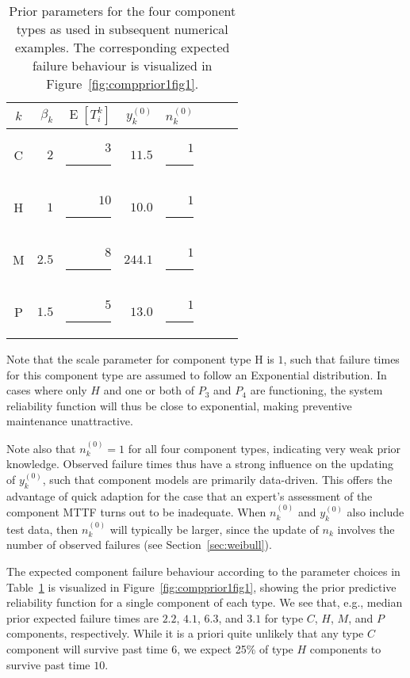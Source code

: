 \documentclass[authoryear]{elsarticle}
\newcommand{\uz}{^{(0)}} %
\newcommand{\E}{\operatorname{E}}
\def\ykz{y\uz_k}
\def\nkz{n\uz_k}
\begin{document}
\begin{table}
\centering
\begin{tabular}{crrrrrrr}
  \toprule
$k$ & $\beta_k$ & $\E[T_i^k]$ & $\ykz$ & $\nkz$ \\
  \midrule
C & $2  $ & $ 3$\rule{1.5ex}{0ex} & $ 11.5$ & $1$\rule{1ex}{0ex} \\
H & $1  $ & $10$\rule{1.5ex}{0ex} & $ 10.0$ & $1$\rule{1ex}{0ex} \\
M & $2.5$ & $ 8$\rule{1.5ex}{0ex} & $244.1$ & $1$\rule{1ex}{0ex} \\
P & $1.5$ & $ 5$\rule{1.5ex}{0ex} & $ 13.0$ & $1$\rule{1ex}{0ex} \\
  \bottomrule
\end{tabular}
\caption{Prior parameters for the four component types as used in subsequent numerical examples.
The corresponding expected failure behaviour is visualized in Figure~\ref{fig:compprior1fig1}.}
\label{tab:priorparams}
\end{table}

Note that the scale parameter for component type H is $1$,
such that failure times for this component type are assumed to follow an Exponential distribution.
In cases where only $H$ and one or both of $P_3$ and $P_4$ are functioning,
the system reliability function will thus be close to exponential,
making preventive maintenance unattractive.

Note also that $\nkz = 1$ for all four component types,
indicating very weak prior knowledge.
Observed failure times thus have a strong influence on the updating of $\ykz$,
such that component models are primarily data-driven.
This offers the advantage of quick adaption
for the case that an expert's assessment of the component MTTF turns out to be inadequate.
When $\nkz$ and $\ykz$ also include test data,
then $\nkz$ will typically be larger,
since the update of $n_k$ involves the number of observed failures
(see Section~\ref{sec:weibull}).

The expected component failure behaviour according to the parameter choices in Table~\ref{tab:priorparams}
is visualized in Figure~\ref{fig:compprior1fig1},
showing the prior predictive reliability function for a single component of each type.
We see that, e.g., median prior expected failure times are
$2.2$, $4.1$, $6.3$, and $3.1$ for type $C$, $H$, $M$, and $P$ components, respectively.
While it is a priori quite unlikely that any type $C$ component will survive past time $6$,
we expect 25\% of type $H$ components to survive past time $10$.
\end{document}
